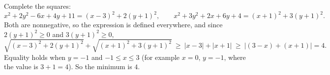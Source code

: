 Complete the squares:
\[
x^2+2y^2-6x+4y+11=(x-3)^2+2(y+1)^2,\qquad x^2+3y^2+2x+6y+4=(x+1)^2+3(y+1)^2 .
\]
Both are nonnegative, so the expression is defined everywhere, and since $2(y+1)^2\ge0$ and $3(y+1)^2\ge0$,
\[
\sqrt{(x-3)^2+2(y+1)^2}+\sqrt{(x+1)^2+3(y+1)^2}\ \ge\ |x-3|+|x+1|\ \ge\ |(3-x)+(x+1)|=4 .
\]
Equality holds when $y=-1$ and $-1\le x\le3$ (for example $x=0$, $y=-1$, where the value is $3+1=4$). So the minimum is $\boxed{4}$.

